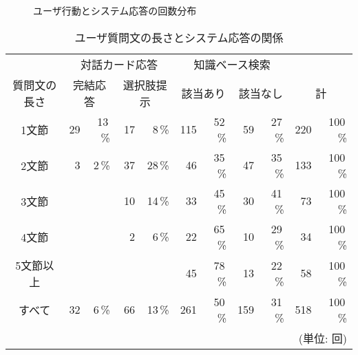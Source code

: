 \begin{figure}
 \begin{center}
  \caption{ユーザ行動とシステム応答の回数分布} 
  \label{fig:ユーザ行動の分析}
 \end{center}
\end{figure}


\begin{table}
 \caption{ユーザ質問文の長さとシステム応答の関係}
 \label{tab:ユーザ質問文の長さとシステム応答の関係}
 \begin{center}
  \small
  \begin{tabular}{c|r@{ (}r@{) }|r@{ (}r@{) }|r@{ (}r@{) }|r@{ (}r@{) }|r@{ (}r@{)}} \hline

   &
   \multicolumn{4}{c|}{対話カード応答} &
   \multicolumn{4}{c|}{知識ベース検索} & 
   \multicolumn{2}{c}{} \\ \cline{2-9}
   
   質問文の長さ &
   \multicolumn{2}{c|}{完結応答} &
   \multicolumn{2}{c|}{選択肢提示} &
   \multicolumn{2}{c|}{該当あり} &
   \multicolumn{2}{c|}{該当なし} &
   \multicolumn{2}{c}{計} \\ \hline

   1文節     & 29 & 13\,\% & 17 &  8\,\% & 115 & 52\,\% &  59 & 27\,\% & 220 & 100\,\% \\
   2文節     &  3 &  2\,\% & 37 & 28\,\% &  46 & 35\,\% &  47 & 35\,\% & 133 & 100\,\% \\
   3文節     &    &      & 10 & 14\,\% &  33 & 45\,\% &  30 & 41\,\% &  73 & 100\,\% \\
   4文節     &    &      &  2 &  6\,\% &  22 & 65\,\% &  10 & 29\,\% &  34 & 100\,\% \\
   5文節以上 &    &      &    &      &  45 & 78\,\% &  13 & 22\,\% &  58 & 100\,\% \\ \hline

   すべて    & 32 &  6\,\% & 66 & 13\,\% & 261 & 50\,\% & 159 & 31\,\% & 518 & 100\,\% \\ \hline
   \multicolumn{11}{r}{(単位: 回)}
  \end{tabular}
  
 \end{center}
\end{table}


